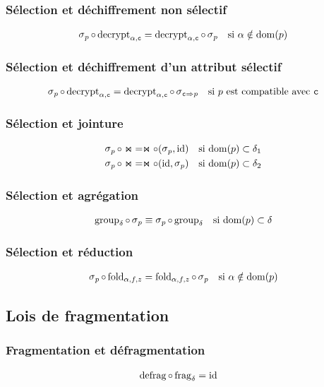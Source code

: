 \subsubsection*{Sélection et déchiffrement non sélectif}
\begin{align*}
\selP \circ \decryptCAlpha 
& = \decryptCAlpha \circ \selP
& \text{si $\alpha \notin \dom(p)$}
\end{align*}
\subsubsection*{Sélection et déchiffrement d'un attribut sélectif}
\begin{align*}
\selP \circ \decryptCAlpha 
& = \decryptCAlpha \circ \sel_{\typeT{c} \Rightarrow p}
& \text{si $p$  est compatible avec $\typeT{c}$}
\end{align*}
\subsubsection*{Sélection et jointure}
\args

\begin{align*}
\selP \circ \Join
& = \Join \circ (\selP, \id)
& \text{si $\dom(p) \subset \delta_1$}\\ 
\selP \circ \Join
& = \Join \circ (\id, \selP)
& \text{si $\dom(p) \subset \delta_2$}
\end{align*}
\subsubsection*{Sélection et agrégation}
\begin{align*}
\groupDelta \circ \selP 
& \equiv \selP \circ \groupDelta
& \text{si $\dom(p) \subset \delta$}
\end{align*}
\subsubsection*{Sélection et réduction}
\begin{align*}
\selP \circ \foldAlphafz & = \foldAlphafz \circ \selP
& \text{si $\alpha \notin \dom(p)$}
\end{align*}
\subsection*{Lois de fragmentation}
\subsubsection*{Fragmentation et défragmentation}
\begin{align*}
\operatorname{defrag} \circ \operatorname{frag}_{\delta}
& = \operatorname{id}
\end{align*}
